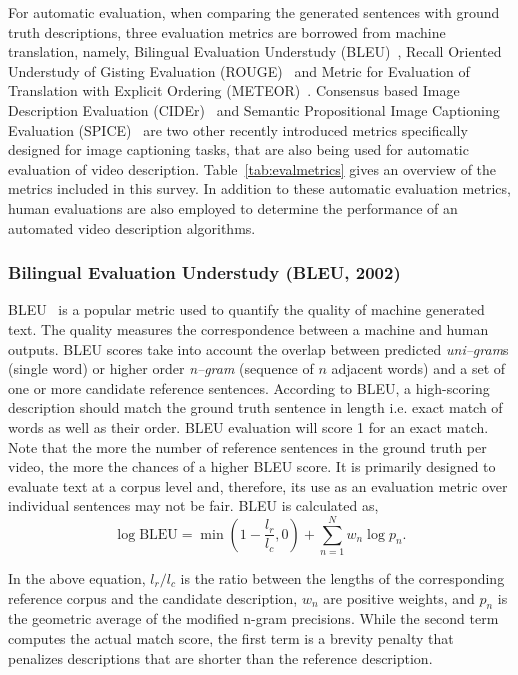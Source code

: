 \documentclass[10pt,journal,compsoc]{IEEEtran}
\begin{document}
For automatic evaluation, when comparing the generated sentences with ground truth descriptions, three evaluation metrics are borrowed from machine translation, namely, Bilingual Evaluation Understudy (BLEU)~\cite{papineni2002bleu}, Recall Oriented Understudy of Gisting Evaluation (ROUGE)~\cite{lin2004rouge} and Metric for Evaluation of Translation with Explicit Ordering (METEOR)~\cite{lavie2005meteor}. Consensus based Image Description Evaluation (CIDEr)~\cite{vedantam2015cider} and Semantic Propositional Image Captioning Evaluation (SPICE)~\cite{anderson2016spice} are two other recently introduced metrics specifically designed for image captioning tasks, that are also being used for automatic evaluation of video description. 
Table~\ref{tab:evalmetrics} gives an overview of the metrics included in this survey. In addition to these automatic evaluation metrics, human evaluations are also employed to determine the performance of an automated video description algorithms.

\subsubsection{Bilingual Evaluation Understudy (BLEU, 2002)}
BLEU~\cite{papineni2002bleu} is a popular metric used to quantify the quality of machine generated text. The quality measures the correspondence between a machine and human outputs. BLEU scores take into account the overlap between predicted \textit{uni--gram}s (single word) or higher order \textit{n--gram} (sequence of $n$ adjacent words) and a set of one or more candidate reference sentences. According to BLEU, a high-scoring description should match the ground truth sentence in length i.e. exact match of words as well as their order. BLEU evaluation will score 1 for an exact match. Note that the more the number of reference sentences in the ground truth per video, the more the chances of a higher BLEU score. It is primarily designed to evaluate text at a corpus level and, therefore, its use as an evaluation metric over individual sentences may not be fair. BLEU is calculated as, 
\vspace{-3mm}
$$\log \text{BLEU} = \min (1-\frac{l_r}{l_c},0) + \sum_{n=1}^{N} w_n\log p_n.$$ 

\noindent
In the above equation, $l_r/l_c$ is the ratio between the lengths of the corresponding reference corpus and the candidate description, 
$w_n$ are positive weights, and $p_n$ is the geometric average of the modified n-gram precisions. While the second term computes the actual match score, the first term is a brevity penalty that penalizes descriptions that are shorter than the reference description. 
\end{document}
